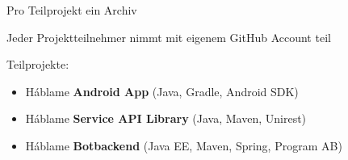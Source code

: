 \begin{frame}
\begin{block}{}
	Pro Teilprojekt	ein Archiv
\end{block}
\begin{block}{}
	Jeder Projektteilnehmer nimmt mit eigenem GitHub Account teil
\end{block}
\begin{block}{}
	Teilprojekte:
	\begin{itemize}\itemsep0pt
		\item Háblame \textbf{Android App} (Java, Gradle, Android SDK)
		\item Háblame \textbf{Service API Library} (Java, Maven, Unirest)
		\item Háblame \textbf{Botbackend} (Java EE, Maven, Spring, Program AB)
	\end{itemize}
\end{block}
\end{frame}